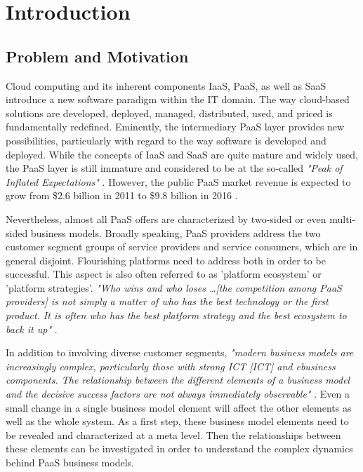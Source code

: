 \chapter{Introduction}\label{ch:intro}

\section{Problem and Motivation}\label{ch:intro:mo}


Cloud computing and its inherent components \acf{IaaS}, \acf{PaaS}, as well as \acf{SaaS} introduce a new software paradigm within the \acf{IT} domain. The way cloud-based solutions are developed, deployed, managed, distributed, used, and priced is fundamentally redefined. Eminently, the intermediary \ac{PaaS} layer provides new possibilities, particularly with regard to the way software is developed and deployed. While the concepts of \ac{IaaS} and \ac{SaaS} are quite mature and widely used, the \ac{PaaS} layer is still immature and considered to be at the so-called \textit{"Peak of Inflated Expectations"} \citep[p. 5]{Smith2012}. However, the public \ac{PaaS} market revenue is expected to grow from \$2.6 billion in 2011 to \$9.8 billion in 2016 \citep[p. 22]{Hendrick2012a}.

Nevertheless, almost all \ac{PaaS} offers are characterized by two-sided or even multi-sided business models. Broadly speaking, \ac{PaaS} providers address the two customer segment groups of service providers and service consumers, which are in general disjoint. Flourishing platforms need to address both in order to be successful. This aspect is also often referred to as 'platform ecosystem' or 'platform strategies'. \textit{"Who wins and who loses \ldots [the competition among \ac{PaaS} providers] is not simply a matter of who has the best technology or the first product. It is often who has the best platform strategy and the best ecosystem to back it up"} \citep[p. 34]{Cusumano2010}.

In addition to involving diverse customer segments, \textit{"modern business models are increasingly complex, particularly those with strong ICT [\acl{ICT}] and ebusiness components. The relationship between the different elements of a business model and the decisive success factors are not always immediately observable"} \citep[p. 14]{Osterwalder2005}. Even a small change in a single business model element will affect the other elements as well as the whole system. As a first step, these business model elements need to be revealed and characterized at a meta level. Then the relationships between these elements can be investigated in order to understand the complex dynamics behind \ac{PaaS} business models.

